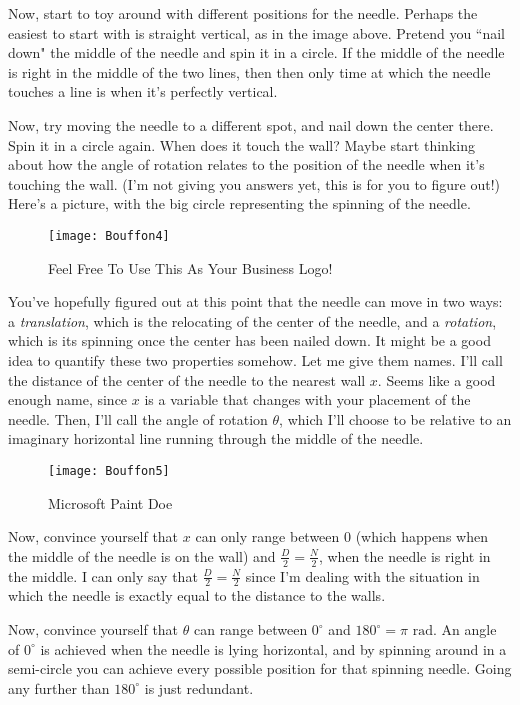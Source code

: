 \documentclass[11pt,titlepage]{article}
\begin{document}
Now, start to toy around with different positions for the needle. Perhaps the easiest to start with is straight vertical, as in the image above. Pretend you ``nail down" the middle of the needle and spin it in a circle. If the middle of the needle is right in the middle of the two lines, then then only time at which the needle touches a line is when it's perfectly vertical. 

Now, try moving the needle to a different spot, and nail down the center there. Spin it in a circle again. When does it touch the wall? Maybe start thinking about how the angle of rotation relates to the position of the needle when it's touching the wall. (I'm not giving you answers yet, this is for you to figure out!)  Here's a picture, with the big circle representing the spinning of the needle.
\begin{figure}[h]
\centering
\texttt{[image: Bouffon4]}
\caption{Feel Free To Use This As Your Business Logo!}
\end{figure}

You've hopefully figured out at this point that the needle can move in two ways: a \textit{translation}, which is the relocating of the center of the needle, and a \textit{rotation}, which is its spinning once the center has been nailed down. It might be a good idea to quantify these two properties somehow. Let me give them names. I'll call the distance of the center of the needle to the nearest wall $x$. Seems like a good enough name, since $x$ is a variable that changes with your placement of the needle. Then, I'll call the angle of rotation $\theta$, which I'll choose to be relative to an imaginary horizontal line running through the middle of the needle.
\begin{figure}[h]
\begin{center}
\texttt{[image: Bouffon5]}
\caption{Microsoft Paint Doe}
\end{center}
\end{figure}

Now, convince yourself that $x$ can only range between $0$ (which happens when the middle of the needle is on the wall) and $\frac{D}{2} = \frac{N}{2}$, when the needle is right in the middle. I can only say that $\frac{D}{2} = \frac{N}{2}$ since I'm dealing with the situation in which the needle is exactly equal to the distance to the walls. 

Now, convince yourself that $\theta$ can range between $0^{\circ}$ and $180^{\circ} = \pi \text{ rad}$. An angle of $0^{\circ}$ is achieved when the needle is lying horizontal, and by spinning around in a semi-circle you can achieve every possible position for that spinning needle. Going any further than $180^{\circ}$ is just redundant. 
\end{document}
